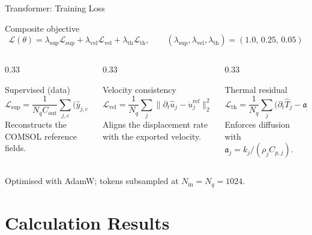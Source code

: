 \documentclass[aspectratio=169,10pt]{beamer}
\begin{document}
\begin{frame}{Transformer: Training Loss}
  \setlength{\abovedisplayskip}{2pt}
  \setlength{\belowdisplayskip}{2pt}
  \setlength{\abovedisplayshortskip}{1pt}
  \setlength{\belowdisplayshortskip}{1pt}
  \begin{block}{Composite objective}
    \[
      \mathcal{L}(\theta)=
      \lambda_{\mathrm{sup}}\mathcal{L}_{\mathrm{sup}}
      +\lambda_{\mathrm{vel}}\mathcal{L}_{\mathrm{vel}}
      +\lambda_{\mathrm{th}}\mathcal{L}_{\mathrm{th}},
      \qquad
      (\lambda_{\mathrm{sup}},\lambda_{\mathrm{vel}},\lambda_{\mathrm{th}})
      =(1.0,\,0.25,\,0.05)
    \]
  \end{block}
  \begin{columns}[T]
    \begin{column}{0.33\textwidth}
      \begin{block}{Supervised (data)}
        \scriptsize
        \[
          \mathcal{L}_{\mathrm{sup}}=
          \frac{1}{N_q C_{\mathrm{out}}}
          \sum_{j,c}\big(\hat y_{j,c}-y_{j,c}\big)^2
        \]
        Reconstructs the COMSOL reference fields.
      \end{block}
    \end{column}
    \begin{column}{0.33\textwidth}
      \begin{block}{Velocity consistency}
        \scriptsize
        \[
          \mathcal{L}_{\mathrm{vel}}=
          \frac{1}{N_q}\sum_{j}
          \big\|\partial_t\hat u_j-\dot u_j^{\mathrm{ref}}\big\|_2^2
        \]
        Aligns the displacement rate with the exported velocity.
      \end{block}
    \end{column}
    \begin{column}{0.33\textwidth}
      \begin{block}{Thermal residual}
        \scriptsize
        \[
          \mathcal{L}_{\mathrm{th}}=
          \frac{1}{N_q}\sum_{j}
          \big(\partial_t\hat T_j-\mathfrak{a}_j\nabla^2\hat T_j\big)^2
        \]
        Enforces diffusion with \(\mathfrak{a}_j=k_j/(\rho_j C_{p,j})\).
      \end{block}
    \end{column}
  \end{columns}
  \vskip 4pt
  \scriptsize
  Optimised with AdamW; tokens subsampled at \(N_{\mathrm{in}}=N_q=1024\).
\end{frame}
\section{Calculation Results}
\end{document}
